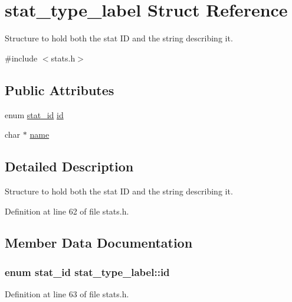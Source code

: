 \hypertarget{structstat__type__label}{\section{stat\-\_\-type\-\_\-label Struct Reference}
\label{structstat__type__label}
}


Structure to hold both the stat I\-D and the string describing it.  




{\ttfamily \#include $<$stats.\-h$>$}

\subsection*{Public Attributes}
\begin{DoxyCompactItemize}
\item 
enum \hyperlink{stat__ids_8h_ac210bd14ba53357098c0b3ebdd69784e}{stat\-\_\-id} \hyperlink{structstat__type__label_a0f5647728338f562228eeed8e3c2d2ca}{id}
\item 
char $\ast$ \hyperlink{structstat__type__label_a4dc872fb0d9d5fb81f1931319d4b1eff}{name}
\end{DoxyCompactItemize}


\subsection{Detailed Description}
Structure to hold both the stat I\-D and the string describing it. 

Definition at line 62 of file stats.\-h.



\subsection{Member Data Documentation}
\hypertarget{structstat__type__label_a0f5647728338f562228eeed8e3c2d2ca}{
\subsubsection[{id}]{\setlength{\rightskip}{0pt plus 5cm}enum {\bf stat\-\_\-id} stat\-\_\-type\-\_\-label\-::id}}\label{structstat__type__label_a0f5647728338f562228eeed8e3c2d2ca}


Definition at line 63 of file stats.\-h.

